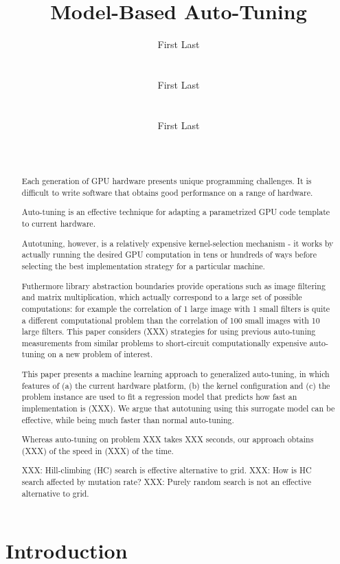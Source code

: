 \documentclass{sig-alternate}
\title{Model-Based Auto-Tuning}
\author{
\alignauthor First Last\\
\affaddr{Affiliation line 1}\\
\affaddr{Affiliation line 2}\\
\email{anon@mail.com}
\alignauthor First Last\\
\affaddr{Affiliation line 1}\\
\affaddr{Affiliation line 2}\\
\email{anon@mail.com}
\alignauthor First Last\\
\affaddr{Affiliation line 1}\\
\affaddr{Affiliation line 2}\\
\email{anon@mail.com}
}
\begin{document}
\maketitle

\begin{abstract}
Each generation of GPU hardware presents unique programming challenges.
It is difficult to write software that obtains good performance on a range of hardware.

Auto-tuning is an effective technique for adapting a parametrized
GPU code template to current hardware.

Autotuning, however, is a relatively expensive kernel-selection mechanism - it
works by actually running the desired GPU computation in tens or hundreds of
ways before selecting the best implementation strategy for a particular
machine.

Futhermore library abstraction boundaries provide operations such as image
filtering and matrix multiplication, which actually correspond to a large set
of possible computations: for example the correlation of 1 large image with 1
small filters is  quite a different computational problem than the correlation
of 100 small images with 10 large filters.
This paper considers (XXX) strategies for using previous auto-tuning
measurements from similar problems to short-circuit computationally
expensive auto-tuning on a new problem of interest.

This paper presents a machine learning approach to generalized auto-tuning, in
which features of
(a) the current hardware platform,
(b) the kernel configuration
and (c) the problem instance are used to fit a regression model that predicts
how fast an implementation is (XXX).
We argue that autotuning using this surrogate model can be effective, while
being much faster than normal auto-tuning.

Whereas auto-tuning on problem XXX takes XXX seconds, our approach obtains
(XXX) of the speed in (XXX) of the time.


XXX: Hill-climbing (HC) search is effective alternative to grid.
XXX: How is HC search affected by mutation rate?
XXX: Purely random search is not an effective alternative to grid.

\end{abstract}


\section{Introduction}
\end{document}
